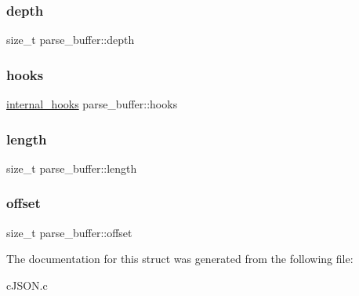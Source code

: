 \subsubsection{\texorpdfstring{depth}{depth}}
{\footnotesize\ttfamily size\+\_\+t parse\+\_\+buffer\+::depth}

\mbox{\label{structparse__buffer_a2c3e99b15da2935fc5d58124ffb4a894}} 
\subsubsection{\texorpdfstring{hooks}{hooks}}
{\footnotesize\ttfamily \hyperlink{structinternal__hooks}{internal\+\_\+hooks} parse\+\_\+buffer\+::hooks}

\mbox{\label{structparse__buffer_a036970e9335896d3cee8459eda9e2eb9}} 
\subsubsection{\texorpdfstring{length}{length}}
{\footnotesize\ttfamily size\+\_\+t parse\+\_\+buffer\+::length}

\mbox{\label{structparse__buffer_af727920073077579942a79de519bb31a}} 
\subsubsection{\texorpdfstring{offset}{offset}}
{\footnotesize\ttfamily size\+\_\+t parse\+\_\+buffer\+::offset}



The documentation for this struct was generated from the following file\+:\begin{DoxyCompactItemize}
\item 
c\+J\+S\+O\+N.\+c\end{DoxyCompactItemize}
